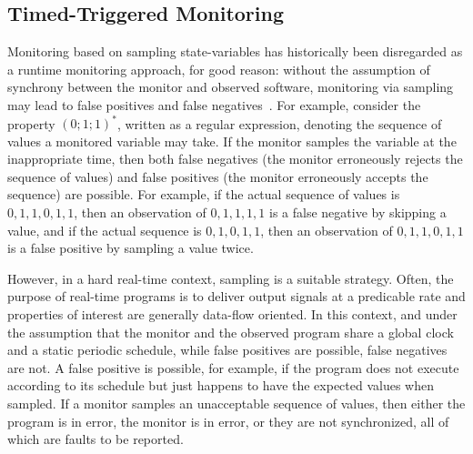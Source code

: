 \subsection{Timed-Triggered Monitoring} \label{sec:sampling}

Monitoring based on sampling state-variables has historically been disregarded
as a runtime monitoring approach, for good reason: without the assumption of
synchrony between the monitor and observed software, monitoring via sampling may
lead to false positives and false negatives~\cite{DwyerDE08}.  For example,
consider the property $(0;1;1)^*$, written as a regular expression, denoting the
sequence of values a monitored variable may take.  If the monitor samples the
variable at the inappropriate time, then both false negatives (the monitor
erroneously rejects the sequence of values) and false positives (the monitor
erroneously accepts the sequence) are possible.  For example, if the actual
sequence of values is $0,1,1,0,1,1$, then an observation of $0,1,1,1,1$ is a
false negative by skipping a value, and if the actual sequence is $0,1,0,1,1$,
then an observation of $0,1,1,0,1,1$ is a false positive by sampling a value
twice.



However, in a hard real-time context, sampling is a suitable strategy.  Often,
the purpose of real-time programs is to deliver output signals at a predicable
rate and properties of interest are generally data-flow oriented.  In this
context, and under the assumption that the monitor and the observed program
share a global clock and a static periodic schedule, while false positives are
possible, false negatives are not.  A false positive is possible, for example,
if the program does not execute according to its schedule but just happens to
have the expected values when sampled.  If a monitor samples an unacceptable
sequence of values, then either the program is in error, the monitor is in
error, or they are not synchronized, all of which are faults to be reported.

